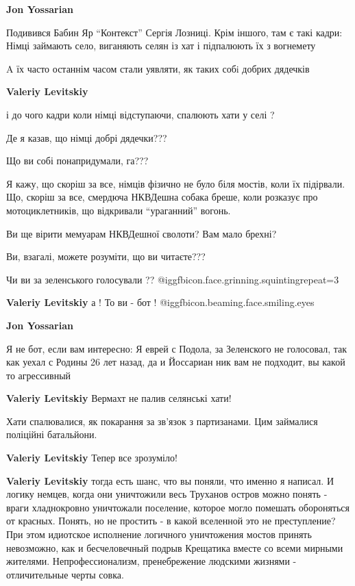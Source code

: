 \begin{itemize}
\begin{itemize}
\begin{itemize} %
\textbf{Jon Yossarian} 

Подивився Бабин Яр \enquote{Контекст} Сергія Лозниці. Крім іншого, там є такі кадри:
Німці займають село, виганяють селян із хат і підпалюють їх з вогнемету

A їх часто останнім часом стали уявляти, як таких собi добрих дядечків

\textbf{Valeriy Levitskiy} 

і до чого кадри коли німці відступаючи, спалюють хати у селі ?

Де я казав, що німці добрі дядечки???

Що ви собі понапридумали, га???

Я кажу, що скоріш за все, німців фізично не було біля мостів, коли їх
підірвали. Що, скоріш за все, смердюча НКВДешна собака бреше, коли розказує про
мотоциклетників, що відкривали \enquote{ураганний} вогонь.

Ви ще вірити мемуарам НКВДешної сволоти? Вам мало брехні?

Ви, взагалі, можете розуміти, що ви читаєте???

Чи ви за зеленського голосували ??
@igg{fbicon.face.grinning.squinting}{repeat=3} 

\textbf{Valeriy Levitskiy} а ! То ви - бот !  @igg{fbicon.beaming.face.smiling.eyes} 

\textbf{Jon Yossarian} 

Я не бот, если вам интересно: Я еврей с Подола, за Зеленского не голосовал, так
как уехал с Родины 26 лет назад, да и Йоссариан ник вам не подходит, вы какой то
агрессивный

\textbf{Valeriy Levitskiy} Вермахт не палив селянські хати!

Хати спалювалися, як покарання за зв'язок з партизанами. Цим займалися
поліційні батальйони.

\textbf{Valeriy Levitskiy} Тепер все зрозуміло!

\textbf{Valeriy Levitskiy} тогда есть шанс, что вы поняли, что именно я написал.
И логику немцев, когда они уничтожили весь Труханов остров можно понять - враги хладнокровно уничтожали поселение, которое могло помешать обороняться от красных.
Понять, но не простить - в какой вселенной это не преступление?
При этом идиотское исполнение логичного уничтожения мостов принять невозможно, как и бесчеловечный подрыв Крещатика вместе со всеми мирными жителями.
Непрофессионализм, пренебрежение людскими жизнями - отличительные черты совка.


\end{itemize}
\end{itemize}
\end{itemize}
